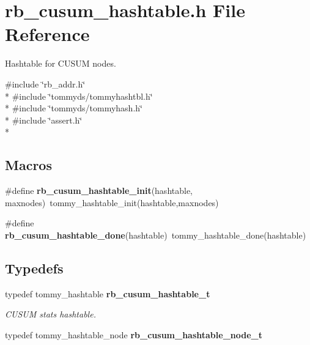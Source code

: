 \section{rb\+\_\+cusum\+\_\+hashtable.\+h File Reference}
\label{rb__cusum__hashtable_8h}


Hashtable for C\+U\+S\+U\+M nodes.  


{\ttfamily \#include \char`\"{}rb\+\_\+addr.\+h\char`\"{}}\\*
{\ttfamily \#include \char`\"{}tommyds/tommyhashtbl.\+h\char`\"{}}\\*
{\ttfamily \#include \char`\"{}tommyds/tommyhash.\+h\char`\"{}}\\*
{\ttfamily \#include \char`\"{}assert.\+h\char`\"{}}\\*
\subsection*{Macros}
\begin{DoxyCompactItemize}
\item 
\#define {\bf rb\+\_\+cusum\+\_\+hashtable\+\_\+init}(hashtable, maxnodes)~tommy\+\_\+hashtable\+\_\+init(hashtable,maxnodes)
\item 
\#define {\bf rb\+\_\+cusum\+\_\+hashtable\+\_\+done}(hashtable)~tommy\+\_\+hashtable\+\_\+done(hashtable)
\end{DoxyCompactItemize}
\subsection*{Typedefs}
\begin{DoxyCompactItemize}
\item 
typedef tommy\+\_\+hashtable {\bf rb\+\_\+cusum\+\_\+hashtable\+\_\+t}
\begin{DoxyCompactList}\small\item\em C\+U\+S\+U\+M stats hashtable. \end{DoxyCompactList}\item 
typedef tommy\+\_\+hashtable\+\_\+node {\bf rb\+\_\+cusum\+\_\+hashtable\+\_\+node\+\_\+t}
\end{DoxyCompactItemize}

